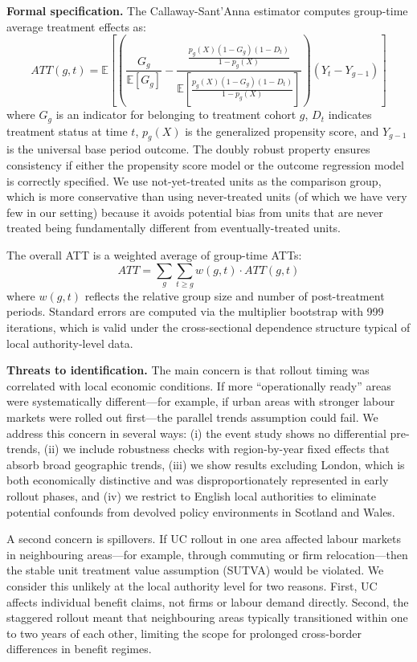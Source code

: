 \documentclass[12pt]{article}
\newcommand{\E}{\mathbb{E}}
\begin{document}
\textbf{Formal specification.} The Callaway-Sant'Anna estimator computes group-time average treatment effects as:
\begin{equation}
    ATT(g,t) = \E\left[\left(\frac{G_g}{\E[G_g]} - \frac{\frac{p_g(X)(1-G_g)(1-D_t)}{1-p_g(X)}}{\E\left[\frac{p_g(X)(1-G_g)(1-D_t)}{1-p_g(X)}\right]}\right)\left(Y_t - Y_{g-1}\right)\right]
\end{equation}
where $G_g$ is an indicator for belonging to treatment cohort $g$, $D_t$ indicates treatment status at time $t$, $p_g(X)$ is the generalized propensity score, and $Y_{g-1}$ is the universal base period outcome. The doubly robust property ensures consistency if either the propensity score model or the outcome regression model is correctly specified. We use not-yet-treated units as the comparison group, which is more conservative than using never-treated units (of which we have very few in our setting) because it avoids potential bias from units that are never treated being fundamentally different from eventually-treated units.

The overall ATT is a weighted average of group-time ATTs:
\begin{equation}
    ATT = \sum_g \sum_{t \geq g} w(g,t) \cdot ATT(g,t)
\end{equation}
where $w(g,t)$ reflects the relative group size and number of post-treatment periods. Standard errors are computed via the multiplier bootstrap with 999 iterations, which is valid under the cross-sectional dependence structure typical of local authority-level data.

\textbf{Threats to identification.} The main concern is that rollout timing was correlated with local economic conditions. If more ``operationally ready'' areas were systematically different---for example, if urban areas with stronger labour markets were rolled out first---the parallel trends assumption could fail. We address this concern in several ways: (i) the event study shows no differential pre-trends, (ii) we include robustness checks with region-by-year fixed effects that absorb broad geographic trends, (iii) we show results excluding London, which is both economically distinctive and was disproportionately represented in early rollout phases, and (iv) we restrict to English local authorities to eliminate potential confounds from devolved policy environments in Scotland and Wales.

A second concern is spillovers. If UC rollout in one area affected labour markets in neighbouring areas---for example, through commuting or firm relocation---then the stable unit treatment value assumption (SUTVA) would be violated. We consider this unlikely at the local authority level for two reasons. First, UC affects individual benefit claims, not firms or labour demand directly. Second, the staggered rollout meant that neighbouring areas typically transitioned within one to two years of each other, limiting the scope for prolonged cross-border differences in benefit regimes.
\end{document}
